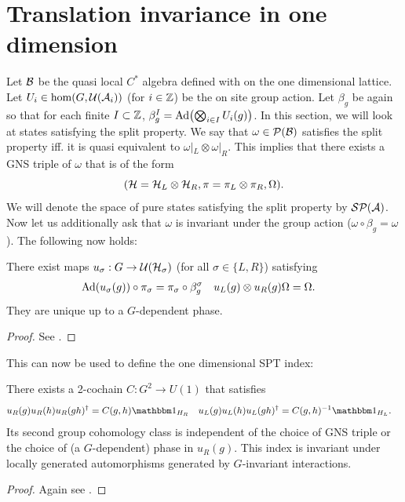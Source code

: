 \documentclass[12pt,a4paper,twoside]{article}
\numberwithin{equation}{section}
\begin{document}
\section{Translation invariance in one dimension}\label{sec:OneDimensionalIndices}
Let $\mathcal B$ be the quasi local $C^*$ algebra defined with on the one dimensional lattice. Let $U_i\in\hom(G,\mathcal U(\mathcal A_i))$ (for $i\in\mathbb Z$) be the on site group action. Let $\beta_g$ be again so that for each finite $I\subset \mathbb Z$, $\beta_g^I=\Ad{\bigotimes_{i\in I}U_i(g)}$. In this section, we will look at states satisfying the split property. We say that $\omega\in\mathcal P(\mathcal B)$ satisfies the split property iff. it is quasi equivalent to $\omega|_{L}\otimes\omega|_{R}$. This implies that there exists a GNS triple of $\omega$ that is of the form
\begin{equation}
	(\mathcal H=\mathcal H_L\otimes\mathcal H_R,\pi=\pi_L\otimes\pi_R,\Omega).
\end{equation}
We will denote the space of pure states satisfying the split property by $\mathcal{S}\mathcal P(\mathcal A)$. Now let us additionally ask that $\omega$ is invariant under the group action ($\omega\circ\beta_g=\omega$). The following now holds:
\begin{lemma}
	There exist maps $u_\sigma:G\rightarrow \mathcal U(\mathcal H_\sigma)$ (for all $\sigma\in\{L,R\}$) satisfying
	\begin{align}
		\Ad{u_\sigma(g)}\circ\pi_\sigma&=\pi_\sigma\circ\beta_g^\sigma&u_L(g)\otimes u_R(g)\Omega&=\Omega.
	\end{align}
	They are unique up to a $G$-dependent phase.
\end{lemma}
\begin{proof}
	See \cite{ogata2019classification}.
\end{proof}
This can now be used to define the one dimensional SPT index:
\begin{lemma}
	There exists a 2-cochain $C:G^2\rightarrow U(1)$ that satisfies
	\begin{align}
		u_R(g)u_R(h)u_R(gh)^{\dagger}&=C(g,h)\id_{H_R}&u_L(g)u_L(h)u_L(gh)^{\dagger}&=C(g,h)^{-1}\id_{H_L}.
	\end{align}
	Its second group cohomology class is independent of the choice of GNS triple or the choice of (a $G$-dependent) phase in $u_R(g)$. This index is invariant under locally generated automorphisms generated by $G$-invariant interactions.
\end{lemma}
\begin{proof}
	Again see \cite{ogata2019classification}.
\end{proof}
\end{document}
